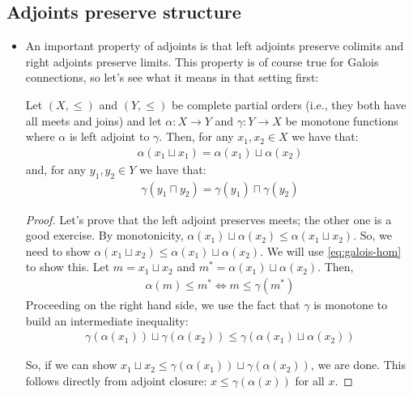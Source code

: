 \subsection{Adjoints preserve structure}
\begin{itemize}
  \item An important property of adjoints is that left adjoints preserve colimits 
  and right adjoints preserve limits. This property is of course true for 
  Galois connections, so let's see what it means in that setting first:
  \begin{theorem}
    Let $(X, \le)$ and $(Y, \le)$ be complete partial orders (i.e., they both have all 
    meets and joins) and let $\alpha : X \to Y$ and $\gamma : Y
    \to X$ be monotone functions where $\alpha$ is left adjoint to $\gamma$. Then,
    for any $x_1, x_2 \in X$ we have that:
    \begin{align}
    \alpha(x_1 \sqcup x_1) = \alpha(x_1) \sqcup \alpha(x_2)
    \end{align}
    and, for any $y_1, y_2 \in Y$ we have that:
    \begin{align}
      \gamma(y_1 \sqcap y_2) = \gamma(y_1) \sqcap \gamma(y_2)
    \end{align}
  \end{theorem}
  \begin{proof}
    Let's prove that the left adjoint preserves meets; the other 
    one is a good exercise.
    By monotonicity, $\alpha(x_1) \sqcup \alpha(x_2) \le \alpha(x_1 \sqcup x_2)$. 
    So, we need to show $\alpha(x_1 \sqcup x_2) \le \alpha(x_1) \sqcup \alpha(x_2)$.
    We will use \cref{eq:galois-hom} to show this. 
    Let $m = x_1 \sqcup x_2$ and $m^* = \alpha(x_1)\sqcup \alpha(x_2)$. Then,
    \begin{align*}
      \alpha(m) \le m^* \iff m \le \gamma(m^*)
    \end{align*}
    Proceeding on the right hand side, 
    we use the fact that $\gamma$ is monotone to build an intermediate inequality:
    \begin{align*}
    \gamma(\alpha(x_1)) \sqcup \gamma(\alpha(x_2)) \le \gamma(\alpha(x_1)\sqcup \alpha(x_2))
    \end{align*}

    So, if we can show $x_1 \sqcup x_2 \le \gamma(\alpha(x_1)) \sqcup \gamma(\alpha(x_2))$, 
    we are done. This follows directly from adjoint closure: $x \le \gamma(\alpha(x))$ for all $x$.
  \end{proof}

\end{itemize}

